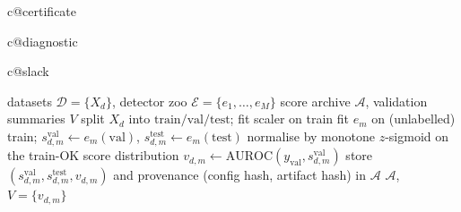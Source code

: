 %

\ifcsname c@certificate\endcsname\else\newtheorem{certificate}{Certificate}\fi
\ifcsname c@diagnostic\endcsname\else\newtheorem{diagnostic}{Diagnostic}\fi
\ifcsname c@slack\endcsname\else\newtheorem{slack}{Proposition}\fi

\begin{algorithm}[t]
\caption{Universal Score Archive Construction}
\label{alg:archive}
\begin{algorithmic}[1]
\Require datasets $\mathcal{D}=\{X_d\}$, detector zoo $\mathcal{E}=\{e_1,\dots,e_M\}$
\Ensure score archive $\mathcal{A}$, validation summaries $V$
  \State split $X_d$ into $\mathrm{train}/\mathrm{val}/\mathrm{test}$; fit scaler on train
    \State fit $e_m$ on (unlabelled) train; $s^{\mathrm{val}}_{d,m}\!\gets\! e_m(\mathrm{val})$, $s^{\mathrm{test}}_{d,m}\!\gets\! e_m(\mathrm{test})$
    \State normalise by monotone $z$-sigmoid on the train-OK score distribution
    \State $v_{d,m} \gets \mathrm{AUROC}(y_{\mathrm{val}}, s^{\mathrm{val}}_{d,m})$ 
    \State store $(s^{\mathrm{val}}_{d,m}, s^{\mathrm{test}}_{d,m}, v_{d,m})$ and provenance (config hash, artifact hash) in $\mathcal{A}$
  \EndFor
\EndFor
\State \Return $\mathcal{A}$, $V=\{v_{d,m}\}$
\end{algorithmic}
\end{algorithm}

